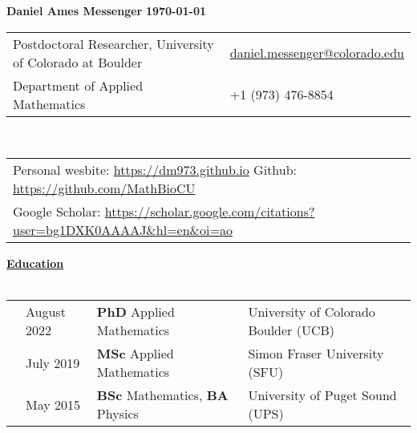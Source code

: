 \documentclass[letterpaper,11pt,oneside]{article}
\newcommand{\headr}[1]{\vspace{10pt}\uline{\Large{\textbf{#1}} \hfill } \\ \vspace{-10pt}\\}
\begin{document}
%
\noindent 
\LARGE{\textbf{Daniel Ames Messenger} \hspace{2in} \textbf{\monthyeardate\today}}   \\
\normalsize
%
%
\begin{center}
\begin{tabular}{l l}
 Postdoctoral Researcher, University of Colorado at Boulder & \hspace{0.5in} \href{mailto:daniel.messenger@colorado.edu}{daniel.messenger@colorado.edu} \\
Department of Applied Mathematics    & \hspace{1in}  +1 (973) 476-8854 \\
\end{tabular}\\ \vspace{0.5cm}
\begin{tabular}{l l}
Personal wesbite: \url{https://dm973.github.io} \quad Github: \url{https://github.com/MathBioCU} &\\
Google Scholar: \url{https://scholar.google.com/citations?user=bg1DXK0AAAAJ&hl=en&oi=ao} & \\

\end{tabular}
\end{center}


\headr{Education}
 
\begin{tabular}{@{} p{0.01cm} p{4.2cm} p{5.5cm} p{8cm}}
& August 2022 & \textbf{PhD} Applied Mathematics & University of Colorado Boulder (UCB)\\ 
&July 2019 & \textbf{MSc} Applied Mathematics & Simon Fraser University (SFU)\\ 
&May 2015  & \textbf{BSc} Mathematics, \textbf{BA} Physics & University of Puget Sound (UPS)\\
\end{tabular}
\end{document}
